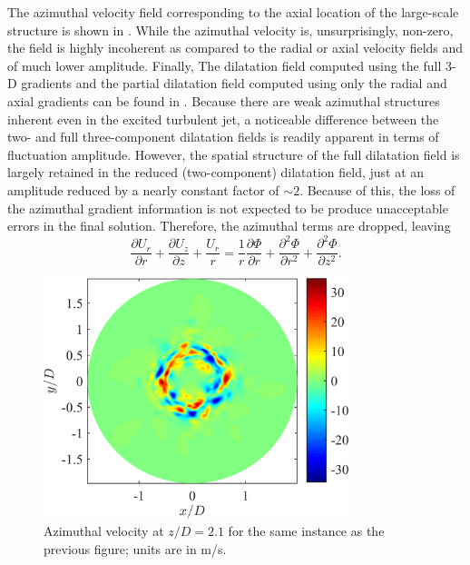 The azimuthal velocity field corresponding to the axial location of the large-scale structure is shown in .
While the azimuthal velocity is, unsurprisingly, non-zero, the field is highly incoherent as compared to the radial or axial velocity fields and of much lower amplitude.
Finally, The dilatation field computed using the full 3-D gradients and the partial dilatation field computed using only the radial and axial gradients can be found in .
Because there are weak azimuthal structures inherent even in the excited turbulent jet, a noticeable difference between the two- and full three-component dilatation fields is readily apparent in terms of fluctuation amplitude.
However, the spatial structure of the full dilatation field is largely retained in the reduced (two-component) dilatation field, just at an amplitude reduced by a nearly constant factor of $\sim 2$.
Because of this, the loss of the azimuthal gradient information is not expected to be produce unacceptable errors in the final solution.
Therefore, the azimuthal terms are dropped, leaving
\begin{equation}
\frac{\partial U_r}{\partial r} + \frac{\partial U_z}{\partial z} + \frac{U_r}{r} = \frac{1}{r} \frac{\partial \Phi}{\partial r} + \frac{\partial^2 \Phi}{\partial r^2} + \frac{\partial^2 \Phi}{\partial z^2}.
\label{eq:helmholtz}
\end{equation}
\begin{figure}
	\centering
	\includegraphics[width = 3.5in]{Figures/LES_phavg_cross_velocity.png}
	\caption{Azimuthal velocity at $z/D = 2.1$ for the same instance as the previous figure; units are in m/s.}
	\label{fig:LES_cross_phavg}
\end{figure}
